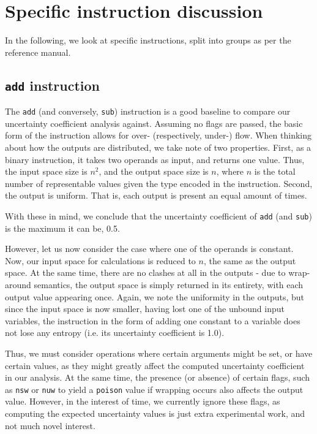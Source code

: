 \documentclass[a4paper]{article}
\newcommand{\inst}[1]{\texttt{#1}}
\newcommand{\cmnt}[2]{{\color{red}{\textbf{#1:} #2}}}
\newcommand{\AL}[1]{\cmnt{AL}{#1}}
\begin{document}
\section*{Specific instruction discussion}
In the following, we look at specific instructions, split into groups as per
the reference manual.


\subsection{\inst{add} instruction}\label{sec:discuss_add}
The \inst{add} (and conversely, \inst{sub}) instruction is a good baseline to
compare our uncertainty coefficient analysis against. Assuming no flags are
passed, the basic form of the instruction allows for over- (respectively,
under-) flow. When thinking about how the outputs are distributed, we take note
of two properties. First, as a binary instruction, it takes two operands as
input, and returns one value. Thus, the input space size is \(n^2\), and the
output space size is \(n\), where \(n\) is the total number of representable
values given the type encoded in the instruction. Second, the output is
uniform. That is, each output is present an equal amount of times. \AL{Will
need to discuss a proof here. Probably.}

With these in mind, we conclude that the uncertainty coefficient of \inst{add}
(and \inst{sub}) is the maximum it can be, 0.5.

However, let us now consider the case where one of the operands is constant.
Now, our input space for calculations is reduced to \(n\), the same as the
output space. At the same time, there are no clashes at all in the outputs -
due to wrap-around semantics, the output space is simply returned in its
entirety, with each output value appearing once. Again, we note the uniformity
in the outputs, but since the input space is now smaller, having lost one of
the unbound input variables, the instruction in the form of adding one constant
to a variable does not lose any entropy (i.e. its uncertainty coefficient is
1.0).

Thus, we must consider operations where certain arguments might be set, or have
certain values, as they might greatly affect the computed uncertainty
coefficient in our analysis. At the same time, the presence (or absence) of
certain flags, such as \texttt{nsw} or \texttt{nuw} to yield a \texttt{poison}
value if wrapping occurs also affects the output value. However, in the
interest of time, we currently ignore these flags, as computing the expected
uncertainty values is just extra experimental work, and not much novel
interest.
\end{document}

